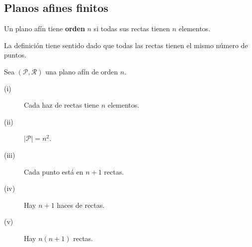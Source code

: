 \subsection{Planos afines finitos}
\begin{definition}
Un plano afín tiene \textbf{orden} $\displaystyle n $ si todas sus rectas tienen $\displaystyle n $ elementos.
\end{definition}
\begin{observation}
La definición tiene sentido dado que todas las rectas tienen el mismo número de puntos.
\end{observation}
\begin{theorem}
Sea $\displaystyle \left(\mathcal{P}, \mathcal{R}\right) $ una plano afín de orden $\displaystyle n $. 
\begin{description}
\item[(i)] Cada haz de rectas tiene $\displaystyle n $ elementos.
\item[(ii)] $\displaystyle \left|\mathcal{P}\right| = n^{2} $.
\item[(iii)] Cada punto está en $\displaystyle n + 1 $ rectas.
\item[(iv)] Hay $\displaystyle n + 1 $ haces de rectas.
\item[(v)] Hay $\displaystyle n\left(n+1\right) $ rectas.
\end{description}
\end{theorem}
